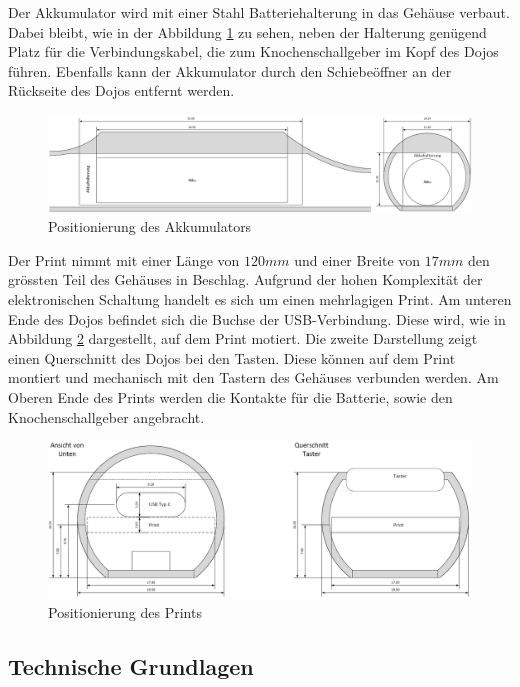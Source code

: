 \newpage

Der Akkumulator wird mit einer Stahl Batteriehalterung in das Gehäuse verbaut. Dabei bleibt, wie in der Abbildung \ref{fig:DojoAkkumulatorQuerschnitt} zu sehen, neben der Halterung genügend Platz für die Verbindungskabel, die zum Knochenschallgeber im Kopf des Dojos führen. Ebenfalls kann der Akkumulator durch den Schiebeöffner an der Rückseite des Dojos entfernt werden.

\begin{figure}[h]
	\centering
	\includegraphics[width=\textwidth]{graphics/DojoAkkumulatorQuerschnitt.png}
	\caption{Positionierung des Akkumulators}
	\label{fig:DojoAkkumulatorQuerschnitt}
\end{figure}

Der Print nimmt mit einer Länge von $120mm$ und einer Breite von $17mm$ den grössten Teil des Gehäuses in Beschlag. Aufgrund der hohen Komplexität der elektronischen Schaltung handelt es sich um einen mehrlagigen Print. Am unteren Ende des Dojos befindet sich die Buchse der USB-Verbindung. Diese wird, wie in Abbildung \ref{fig:DojoPrintQuerschnitt} dargestellt, auf dem Print motiert. Die zweite Darstellung zeigt einen Querschnitt des Dojos bei den Tasten. Diese können auf dem Print montiert und mechanisch mit den Tastern des Gehäuses verbunden werden. Am Oberen Ende des Prints werden die Kontakte für die Batterie, sowie den Knochenschallgeber angebracht.

\begin{figure}[h]
	\centering
	\includegraphics[width=\textwidth]{graphics/DojoPrintQuerschnitt.png}
	\caption{Positionierung des Prints}
	\label{fig:DojoPrintQuerschnitt}
\end{figure}

\newpage

\subsection{Technische Grundlagen}
